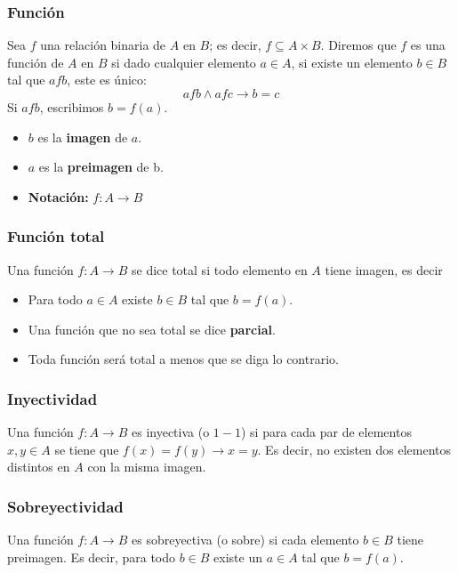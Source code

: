 \begin{multicols}{2}
    \subsubsection*{Función}
    Sea $f$ una relación binaria de $A$ en $B$; es decir, $f \subseteq A \times B$. Diremos que $f$ es una función de $A$ en $B$ si dado cualquier elemento $a \in A$, si existe un elemento $b \in B$ tal que $afb$, este es único:
    $$
    afb \wedge afc \rightarrow b = c
    $$
    Si $afb$, escribimos $b = f(a)$.
    \begin{itemize}
        \item $b$ es la \textbf{imagen} de $a$.
        \item $a$ es la \textbf{preimagen} de b.
        \item \textbf{Notación:} $f: A \rightarrow B$
    \end{itemize}
    
    \subsubsection*{Función total}
    Una función $f:A \rightarrow B$ se dice total si todo elemento en $A$ tiene imagen, es decir
    \begin{itemize}
        \item Para todo $a \in A$ existe $b \in B$ tal que $b = f(a)$.
        \item Una función que no sea total se dice \textbf{parcial}.
        \item Toda función será total a menos que se diga lo contrario.
    \end{itemize}
    
    \subsubsection*{Inyectividad}
    Una función $f:A \rightarrow B$ es inyectiva (o $1-1$) si para cada par de elementos $x,y \in A$ se tiene que $f(x) = f(y) \rightarrow x = y$. Es decir, no existen dos elementos distintos en $A$ con la misma imagen.
    
    \subsubsection*{Sobreyectividad}
    Una función $f:A \rightarrow B$ es sobreyectiva (o sobre) si cada elemento $b \in B$ tiene preimagen. Es decir, para todo $b \in B$ existe un $a \in A$ tal que $b = f(a)$.
    

\end{multicols}
